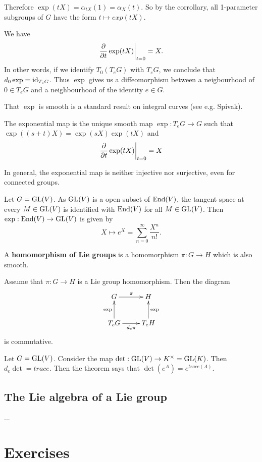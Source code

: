 \documentclass[11pt, english]{article}
\begin{document}
Therefore $\exp(tX)=\alpha_{tX}(1) = \alpha_X(t)$. So by the corrollary, all 1-parameter subgroups of $G$ have the form $t \mapsto exp(tX)$. 

We have
$$
\restr{\dd{}{t} \exp(tX)}{t=0} = X.
$$
In other words, if we identify $T_0(T_eG)$ with $T_eG$, we conclude that $d_0 \exp = \text{id}_{T_eG}$. Thus $\exp$ gives us a diffeomorphism between a neigbourhood of $0 \in T_eG$ and a neighbourhood of the identity $e \in G$.

That $\exp$ is smooth is a standard result on integral curves (see e.g. Spivak).

\begin{thm}
  The exponential map is the unique smooth map $\exp:T_eG \to G$ such that $\exp((s+t)X) = \exp(sX)\exp(tX)$ and
$$
\restr{\dd{}{t} \exp(tX)}{t=0}=X
$$
\end{thm}
In general, the exponential map is neither injective nor surjective, even for connected groups.
\begin{example}
Let $G = \operatorname{GL}(V)$. As $\operatorname{GL}(V)$ is a open subset of $\operatorname{End}(V)$, the tangent space at every $M \in \operatorname{GL}(V)$ is identified with $\operatorname{End}(V)$ for all $M \in \operatorname{GL}(V)$. Then $\exp:\operatorname{End}(V) \to \operatorname{GL}(V)$ is given by 
$$
X \mapsto e^X = \sum_{n=0}^\infty \frac{X^n}{n!}.
$$
\end{example}

A \textbf{homomorphism of Lie groups} is a homomorphism $\pi:G \to H$ which is also smooth.

\begin{thm}
 Assume that $\pi:G \to H$ is a Lie group homomorphism. Then the diagram
$$
\xymatrix{
G \ar[r]^\pi & H \\
T_eG \ar[u]^{\exp} \ar[r]_{d_e\pi} & T_e H \ar[u]_\exp
}
$$
is commutative.
\end{thm}

\begin{example}
  Let $G = \operatorname{GL}(V)$. Consider the map $\det:\operatorname{GL}(V) \to K^\times = \operatorname{GL}(K)$. Then $d_e \det = trace$. Then the theorem says that $\det(e^A)=e^{trace(A)}$.
\end{example}

\subsection{The Lie algebra of a Lie group}
...


\appendix
\section{Exercises}
\end{document}
